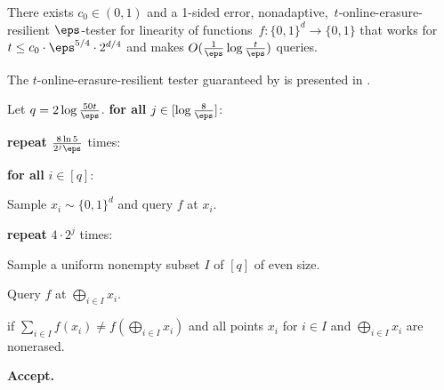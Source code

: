 \documentclass{toc}
\begin{document}
\begin{theorem}\label{thm:linearity_3}
There exists %
$c_0 \in (0,1)$ and a 1-sided error, nonadaptive,~$t$-online-erasure-resilient $\eps$-tester for linearity of functions~$f\colon \{0,1\}^d \to \{0,1\}$ that  works for $t \leq c_0\cdot\eps^{5/4} \cdot  2^{d/4}$ and makes $O(\frac{1}{\eps}\log \frac{t}{\eps})$ queries.
\end{theorem}




The $t$-online-erasure-resilient tester guaranteed by  is presented in .


\begin{algorithm} 
	\caption{An Online-Erasure-Resilient Linearity Tester}
	\begin{algorithmic}[1]
		
		\State Let $q = 2\log\frac{50t}\eps$. \label{step:define_q}
		\State\textbf{for all} $j \in [\log \frac 8 \eps]$: \label{step:define_j}
		
		\State\label{step:repeat} \indent \textbf{repeat} $\frac{8 \ln 5}{2^j\eps}$ times:
 		
		\State \indent \indent \textbf{for all} {$i \in [q]$}:\label{step:loop_query_x_i}

		\State \indent \indent \indent Sample $x_i \sim \{0,1\}^d$ and query $f$ at $x_i$. \label{step:query_x_i}
		
		\State \indent \indent\textbf{repeat} $4 \cdot 2^j$ times:\label{step:query_sums}
		

        \State \indent \indent \indent Sample a uniform nonempty subset $I$ of $[q]$ of even size.
        
        
        \State \indent \indent \indent Query $f$ at $\bigoplus_{i \in I}{x_i}$.\label{step:sample-I}
		
		\State \indent \indent {} if $\sum_{i\in I}f(x_i) \neq f(\bigoplus_{i \in I}{x_i})$ and all points $x_i$ for $i\in I$ and $\bigoplus_{i \in I}{x_i}$ are nonerased.  \label{step:reject}

		\State \textbf{Accept.}
	\end{algorithmic}
	\label{alg:linearity_3}
\end{algorithm}
\end{document}
